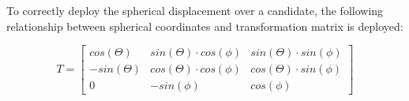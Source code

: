 \begin{figure}[h!]
\end{figure}

\begin{snippet}[h!]
\centering
{}
\caption{Object angle twin post-processor YAML descriptor example}
\label{code:obj_angle_twin}
\end{snippet}


To correctly deploy the spherical displacement over a candidate, the following relationship between spherical coordinates and transformation matrix is deployed:

\begin{equation}
T=\begin{bmatrix}
cos(\Theta) & sin(\Theta)\cdot cos(\phi) & sin(\Theta)\cdot sin(\phi) \\
-sin(\Theta)& cos(\Theta)\cdot cos(\phi)& cos(\Theta)\cdot sin(\phi) \\
0 & -sin(\phi) & cos(\phi)
\end{bmatrix}
\end{equation}



